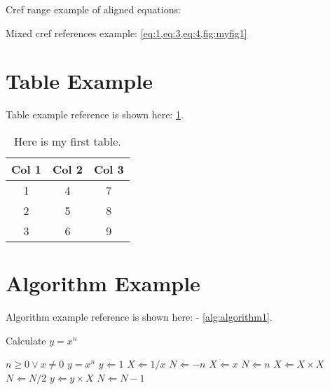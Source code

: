 \documentclass[12pt]{book}
\begin{document}
\noindent Cref range example of aligned equations: 
 
\noindent Mixed cref references example: \cref{eq:1,eq:3,eq:4,fig:myfig1}

\newpage
\section{Table Example}

\noindent Table example reference is shown here: \cref{tab:mytable}.

\begin{table}[h!]
  \centering
  \begin{tabular}{ccc}
  \hline
  \textbf{Col 1} & \textbf{Col 2} & \textbf{Col 3} \\ \hline
  1              & 4              & 7              \\ \hline
  2              & 5              & 8              \\ \hline
  3              & 6              & 9              \\ \hline
  \end{tabular}
  \caption{Here is my first table.}
  \label{tab:mytable}
\end{table}

\newpage
\section{Algorithm Example}

\noindent Algorithm example reference is shown here: - \cref{alg:algorithm1}. 

\begin{algorithm} %
  \caption{Calculate $y = x^n$} %
  \label{alg:algorithm1} %
  \begin{algorithmic} %
      \REQUIRE $n \geq 0 \vee x \neq 0$
      \ENSURE $y = x^n$
      \STATE $y \Leftarrow 1$
          \STATE $X \Leftarrow 1 / x$
          \STATE $N \Leftarrow -n$
      \ELSE
          \STATE $X \Leftarrow x$
          \STATE $N \Leftarrow n$
      \ENDIF
              \STATE $X \Leftarrow X \times X$
              \STATE $N \Leftarrow N / 2$
          \ELSE[$N$ is odd]
              \STATE $y \Leftarrow y \times X$
              \STATE $N \Leftarrow N - 1$
          \ENDIF
      \ENDWHILE
  \end{algorithmic}
\end{algorithm}
\end{document}
